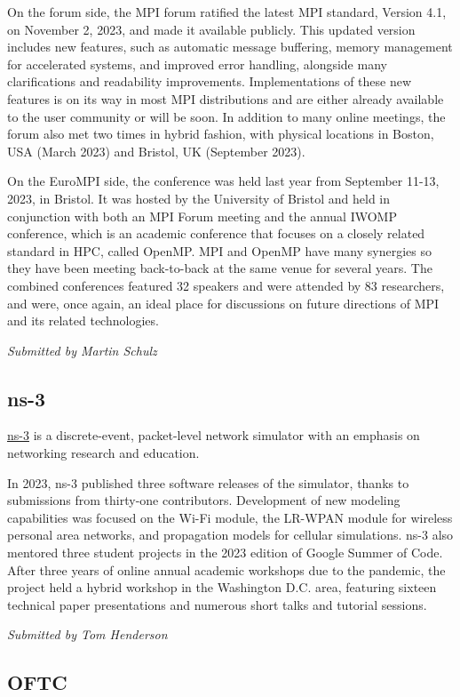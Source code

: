 \documentclass[a4paper]{report}
\begin{document}
On the forum side, the MPI forum ratified the latest MPI standard, Version 4.1, on November 2, 2023, and made it available publicly. This updated version includes new features, such as automatic message buffering, memory management for accelerated systems, and improved error handling, alongside many clarifications and readability improvements. Implementations of these new features is on its way in most MPI distributions and are either already available to the user community or will be soon. In addition to many online meetings, the forum also met two times in hybrid fashion, with physical locations in Boston, USA (March 2023) and Bristol, UK (September 2023).

On the EuroMPI side, the conference was held last year from September 11-13, 2023, in Bristol. It was hosted by the University of Bristol and held in conjunction with both an MPI Forum meeting and the annual IWOMP conference, which is an academic conference that focuses on a closely related standard in HPC, called OpenMP. MPI and OpenMP have many synergies so they have been meeting back-to-back at the same venue for several years. The combined conferences featured 32 speakers and were attended by 83 researchers, and were, once again, an ideal place for discussions on future directions of MPI and its related technologies.

{\em Submitted by Martin Schulz}

\subsection{ns-3}

\href{https://www.nsnam.org}{ns-3} is a discrete-event, packet-level network simulator with an emphasis on networking research and education.

In 2023, ns-3 published three software releases of the simulator, thanks to submissions from thirty-one contributors.  Development of new modeling capabilities was focused on the Wi-Fi module, the LR-WPAN module for wireless personal area networks, and propagation models for cellular simulations.  ns-3 also mentored three student projects in the 2023 edition of Google Summer of Code.  After three years of online annual academic workshops due to the pandemic, the project held a hybrid workshop in the Washington D.C. area, featuring sixteen technical paper presentations and numerous short talks and tutorial sessions.

{\em Submitted by Tom Henderson}

\subsection{OFTC}
\end{document}
